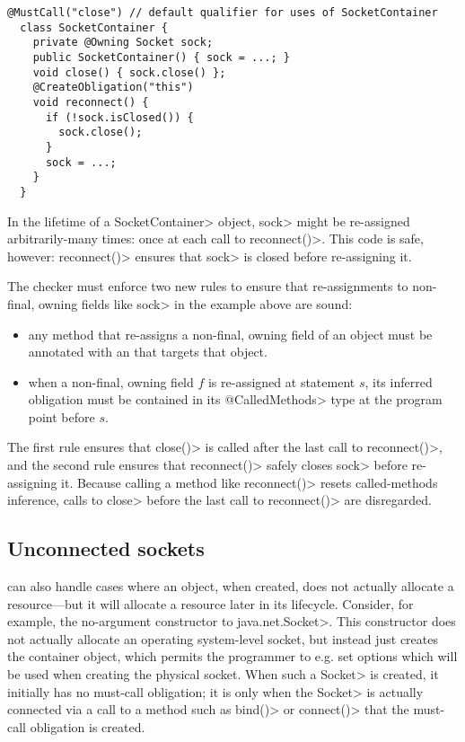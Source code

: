 \begin{lstlisting}[frame=tb,belowskip=3mm]
  @MustCall("close") // default qualifier for uses of SocketContainer
  class SocketContainer {
    private @Owning Socket sock;
    public SocketContainer() { sock = ...; } 
    void close() { sock.close() };
    @CreateObligation("this")
    void reconnect() {
      if (!sock.isClosed()) {
        sock.close();
      }
      sock = ...;
    }
  }
\end{lstlisting}
In the lifetime of a \<SocketContainer> object, \<sock>
might be re-assigned arbitrarily-many times: once at each
call to \<reconnect()>. This code is safe, however: \<reconnect()>
ensures that \<sock> is closed before re-assigning it.

The checker must enforce two new rules to ensure that
re-assignments to non-final, owning fields like \<sock> in the example
above are sound:
\begin{itemize}
\item any method that re-assigns a non-final, owning field of an object
  must be annotated with an \ResetMustCall that targets that object.
\item when a non-final, owning field $f$ is re-assigned at statement $s$,
  its inferred \MustCall obligation must be contained in its \<@CalledMethods>
  type at the program point before $s$.
\end{itemize}
\noindent
The first rule ensures that \<close()> is called after the last call
to \<reconnect()>, and the second rule ensures that \<reconnect()>
safely closes \<sock> before re-assigning it. Because calling
a \ResetMustCall method like \<reconnect()> resets called-methods
inference, calls to \<close> before the last call to \<reconnect()>
are disregarded.

\subsection{Unconnected sockets}
\label{sec:unconnected-sockets}
\ResetMustCall can also handle cases where an object, when created,
does not actually allocate a resource---but it will allocate a resource
later in its lifecycle. Consider, for example, the no-argument constructor
to \<java.net.Socket>. This constructor does not actually allocate an
operating system-level socket, but instead just creates the container
object, which permits the programmer to e.g. set options which will be used
when creating the physical socket. When such a \<Socket> is created, it
initially has no must-call obligation; it is only when the \<Socket> is
actually connected via a call to a method such as \<bind()>
or \<connect()> that the must-call obligation is created.

